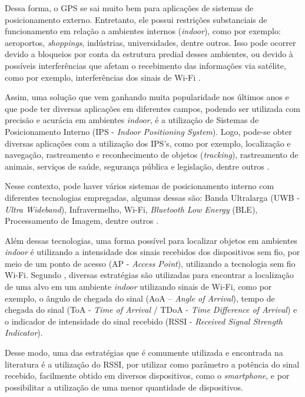 \documentclass[12pt]{artigoifce}
\begin{document}
Dessa forma, o GPS se sai muito bem para aplicações de sistemas de posicionamento externo. Entretanto, ele possui restrições substanciais de funcionamento em relação a ambientes internos (\textit{indoor}), como por exemplo: aeroportos, \textit{shoppings}, indústrias, universidades, dentre outros. Isso pode ocorrer devido a bloqueios por conta da estrutura predial desses ambientes, ou devido à possíveis interferências que afetam o recebimento das informações via satélite, como por exemplo, interferências dos sinais de  Wi-Fi \cite{simoes2020}.

Assim, uma solução que vem ganhando muita popularidade nos últimos anos e que pode ter diversas aplicações em diferentes campos, podendo ser utilizada com precisão e acurácia em ambientes \textit{indoor}, é a utilização de Sistemas de Posicionamento Interno (IPS - \textit{Indoor Positioning System}). Logo, pode-se obter diversas aplicações com a utilização dos IPS's, como por exemplo, localização e navegação, rastreamento e reconhecimento de objetos (\textit{tracking}), rastreamento de animais, serviços de saúde, segurança pública e legislação, dentre outros \cite{mainetti2014, nessa2020}.

Nesse contexto, pode haver vários sistemas de posicionamento interno com diferentes tecnologias empregadas, algumas dessas são: Banda Ultralarga (UWB - \textit{Ultra Wideband}), Infravermelho, Wi-Fi, \textit{Bluetooth Low Energy} (BLE), Processamento de Imagem, dentre outros \cite{sun2017}.

Além dessas tecnologias, uma forma possível para localizar objetos em ambientes \textit{indoor} é utilizando a intensidade dos sinais recebidos dos dispositivos sem fio, por meio de um ponto de acesso (AP - \textit{Access Point}), utilizando a tecnologia sem fio Wi-Fi. Segundo ,  diversas estratégias são utilizadas para encontrar a localização de uma alvo em um ambiente \textit{indoor} utilizando sinais de Wi-Fi, como por exemplo, o ângulo de chegada do sinal  (AoA – \textit{Angle of Arrival}), tempo de chegada do sinal (ToA - \textit{Time of Arrival} / TDoA - \textit{Time Difference of Arrival}) e o indicador de intensidade do sinal recebido (RSSI - \textit{Received Signal Strength Indicator}).

Desse modo, uma das estratégias que é comumente utilizada e encontrada na literatura é a utilização do RSSI, por utilizar como parâmetro a potência do sinal recebido, facilmente obtido em diversos dispositivos, como o \textit{smartphone}, e por possibilitar a utilização de uma menor quantidade de dispositivos. 
\end{document}
